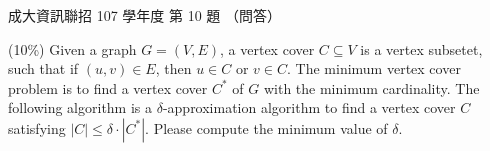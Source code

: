 \begin{pastexam}[label={px:ncku-107-prog-10}]{成大資訊聯招 107 學年度 第 10 題}
（問答）

(10\%) Given a graph $G=(V,E)$, a vertex cover $C\subseteq V$ is a vertex subsetet, such that
if $(u,v)\in E$, then $u\in C$ or $v\in C$. The minimum vertex cover problem is to find a vertex
cover $C^*$ of $G$ with the minimum cardinality. The following algorithm is a
$\delta$-approximation algorithm to find a vertex cover $C$ satisfying
$|C|\le\delta\cdot|C^*|$. Please compute the minimum value of $\delta$.

\begin{center}
\end{center}
\end{pastexam}

